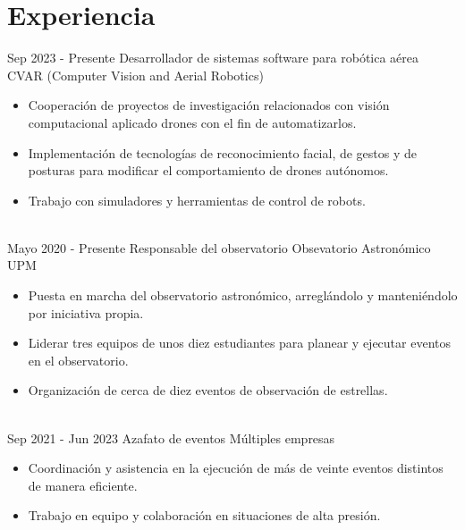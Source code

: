 \documentclass[letterpaper]{cv} %
\begin{document}
\makeprofile %
 

\color{black!70}
\section{Experiencia}

\begin{twenty} %
\twentyitem
    	{Sep 2023 -}
		{Presente}
        {Desarrollador de sistemas software para robótica aérea}
        {CVAR (Computer Vision and Aerial Robotics)}
        {}
        {\begin{itemize}
        \item Cooperación de proyectos de investigación relacionados con visión computacional aplicado drones con el fin de automatizarlos.
        \item Implementación de tecnologías de reconocimiento facial, de gestos y de posturas para modificar el comportamiento de drones autónomos.
        \item Trabajo con simuladores y herramientas de control de robots.
        \end{itemize}}
        \\
	\twentyitem
    	{Mayo 2020 -}
		{Presente}
        {Responsable del observatorio}
        {Obsevatorio Astronómico UPM}
        {}
        {
        {\begin{itemize}
        \item Puesta en marcha del observatorio astronómico, arreglándolo y manteniéndolo por iniciativa propia.
        \item Liderar tres equipos de unos diez estudiantes para planear y ejecutar eventos en el observatorio.
        \item Organización de cerca de diez eventos de observación de estrellas.
    \end{itemize}}
        }
    \\   
    \twentyitem
   		{Sep 2021 -}
		{Jun 2023}
        {Azafato de eventos}
        {Múltiples empresas}
        {}
        {
        {\begin{itemize}
        \item Coordinación y asistencia en la ejecución de más de veinte eventos distintos de manera eficiente.
        \item Trabajo en equipo y colaboración en situaciones de alta presión.
    \end{itemize}}
        }
        
\end{twenty}
\end{document}
